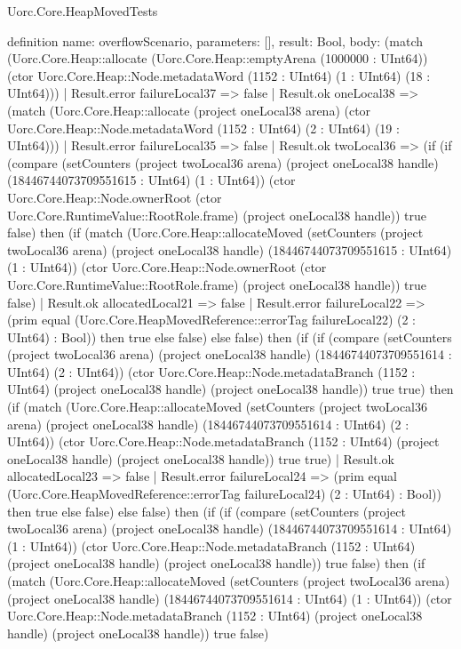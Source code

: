 \begin{lexlean}{Uorc.Core.HeapMovedTests}
\begin{semanticmodule}
definition{
  name: overflowScenario,
  parameters: [],
  result: Bool,
  body: (match (Uorc.Core.Heap::allocate (Uorc.Core.Heap::emptyArena (1000000 : UInt64)) (ctor Uorc.Core.Heap::Node.metadataWord (1152 : UInt64) (1 : UInt64) (18 : UInt64)))
    | Result.error failureLocal37 => false
    | Result.ok oneLocal38 => (match (Uorc.Core.Heap::allocate (project oneLocal38 arena) (ctor Uorc.Core.Heap::Node.metadataWord (1152 : UInt64) (2 : UInt64) (19 : UInt64)))
      | Result.error failureLocal35 => false
      | Result.ok twoLocal36 => (if (if (compare (setCounters (project twoLocal36 arena) (project oneLocal38 handle) (18446744073709551615 : UInt64) (1 : UInt64)) (ctor Uorc.Core.Heap::Node.ownerRoot (ctor Uorc.Core.RuntimeValue::RootRole.frame) (project oneLocal38 handle)) true false) then (if (match (Uorc.Core.Heap::allocateMoved (setCounters (project twoLocal36 arena) (project oneLocal38 handle) (18446744073709551615 : UInt64) (1 : UInt64)) (ctor Uorc.Core.Heap::Node.ownerRoot (ctor Uorc.Core.RuntimeValue::RootRole.frame) (project oneLocal38 handle)) true false)
        | Result.ok allocatedLocal21 => false
        | Result.error failureLocal22 => (prim equal (Uorc.Core.HeapMovedReference::errorTag failureLocal22) (2 : UInt64) : Bool)) then true else false) else false) then (if (if (compare (setCounters (project twoLocal36 arena) (project oneLocal38 handle) (18446744073709551614 : UInt64) (2 : UInt64)) (ctor Uorc.Core.Heap::Node.metadataBranch (1152 : UInt64) (project oneLocal38 handle) (project oneLocal38 handle)) true true) then (if (match (Uorc.Core.Heap::allocateMoved (setCounters (project twoLocal36 arena) (project oneLocal38 handle) (18446744073709551614 : UInt64) (2 : UInt64)) (ctor Uorc.Core.Heap::Node.metadataBranch (1152 : UInt64) (project oneLocal38 handle) (project oneLocal38 handle)) true true)
        | Result.ok allocatedLocal23 => false
        | Result.error failureLocal24 => (prim equal (Uorc.Core.HeapMovedReference::errorTag failureLocal24) (2 : UInt64) : Bool)) then true else false) else false) then (if (if (compare (setCounters (project twoLocal36 arena) (project oneLocal38 handle) (18446744073709551614 : UInt64) (1 : UInt64)) (ctor Uorc.Core.Heap::Node.metadataBranch (1152 : UInt64) (project oneLocal38 handle) (project oneLocal38 handle)) true false) then (if (match (Uorc.Core.Heap::allocateMoved (setCounters (project twoLocal36 arena) (project oneLocal38 handle) (18446744073709551614 : UInt64) (1 : UInt64)) (ctor Uorc.Core.Heap::Node.metadataBranch (1152 : UInt64) (project oneLocal38 handle) (project oneLocal38 handle)) true false)
}
\end{semanticmodule}
\end{lexlean}
